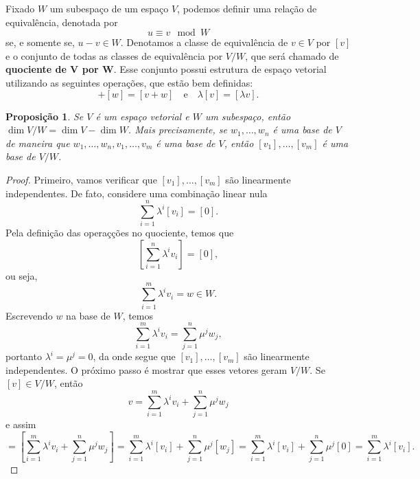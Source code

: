 \documentclass{article}
\newtheorem{proposition}[definition]{Proposição}
\begin{document}
Fixado $W$ um subespaço de um espaço $V$, podemos definir uma relação de equivalência, denotada por \begin{equation}
    u \equiv v \mod W
\end{equation} se, e somente se, $u - v \in W$. Denotamos a classe de equivalência de $v \in V$ por $[v]$ e o conjunto de todas as classes de equivalência por $V/W$, que será chamado de \textbf{quociente de V por W}. Esse conjunto possui estrutura de espaço vetorial utilizando as seguintes operações, que estão bem definidas: \begin{equation}
    [v] + [w] = [v + w] \quad \text{e} \quad \lambda [v] = [\lambda v].
\end{equation}

\begin{proposition}
    Se $V$ é um espaço vetorial e $W$ um subespaço, então $\dim V/W = \dim V - \dim W$. Mais precisamente, se $w_1, \dots, w_n$ é uma base de $V$ de maneira que $w_1, \dots, w_n, v_1, \dots, v_m$ é uma base de $V$, então $[v_1], \dots, [v_m]$ é uma base de $V/W$.
\end{proposition}
\begin{proof}
    Primeiro, vamos verificar que $[v_1], \dots, [v_m]$ são linearmente independentes. De fato, considere uma combinação linear nula \begin{equation}
        \sum_{i = 1}^n \lambda^i [v_i] = [0].
    \end{equation} Pela definição das operaçções no quociente, temos que \begin{equation}
        \left[\sum_{i = 1}^n \lambda^i v_i\right] = [0],
    \end{equation} ou seja, \begin{equation}
        \sum_{i = 1}^m \lambda^i v_i = w \in W.
    \end{equation} Escrevendo $w$ na base de $W$, temos \begin{equation}
        \sum_{i = 1}^m \lambda^i v_i = \sum_{j = 1}^n \mu^j w_j,
    \end{equation} portanto $\lambda^i = \mu^j = 0$, da onde segue que $[v_1], \dots, [v_m]$ são linearmente independentes. O próximo passo é mostrar que esses vetores geram $V/W$. Se $[v] \in V/W$, então \begin{equation}
        v = \sum_{i = 1}^m \lambda^i v_i + \sum_{j = 1}^n \mu^j w_j
    \end{equation} e assim \begin{equation}
        [v] = \left[\sum_{i = 1}^m \lambda^i v_i + \sum_{j = 1}^n \mu^j w_j\right] = \sum_{i = 1}^m \lambda^i [v_i] + \sum_{j = 1}^n \mu^j [w_j] = \sum_{i = 1}^m \lambda^i [v_i] + \sum_{j = 1}^n \mu^j [0] = \sum_{i = 1}^m \lambda^i [v_i].
    \end{equation}
\end{proof}
\end{document}
